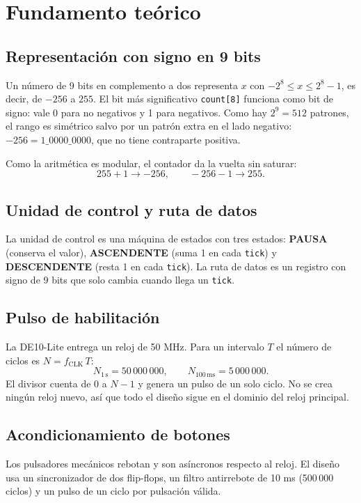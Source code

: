 \documentclass[11pt,a4paper]{article}
\begin{document}
\section{Fundamento te\'orico}
\subsection{Representaci\'on con signo en 9 bits}
Un n\'umero de 9 bits en complemento a dos representa $x$ con $-2^{8}\le x\le 2^{8}-1$, es decir, de $-256$ a $255$. El bit m\'as significativo \texttt{count[8]} funciona como bit de signo: vale 0 para no negativos y 1 para negativos. Como hay $2^9=512$ patrones, el rango es sim\'etrico salvo por un patr\'on extra en el lado negativo: $-256 = 1\_0000\_0000$, que no tiene contraparte positiva.

Como la aritm\'etica es modular, el contador da la vuelta sin saturar:
\[
255 + 1 \longrightarrow -256, \qquad -256 - 1 \longrightarrow 255.
\]

\subsection{Unidad de control y ruta de datos}
La unidad de control es una m\'aquina de estados con tres estados: \textbf{PAUSA} (conserva el valor), \textbf{ASCENDENTE} (suma 1 en cada \texttt{tick}) y \textbf{DESCENDENTE} (resta 1 en cada \texttt{tick}). La ruta de datos es un registro con signo de 9 bits que solo cambia cuando llega un \texttt{tick}.

\subsection{Pulso de habilitaci\'on}
La DE10-Lite entrega un reloj de 50 MHz. Para un intervalo $T$ el n\'umero de ciclos es $N=f_{\text{CLK}}\,T$:
\[
N_{1\,\text{s}} = 50\,000\,000, \qquad N_{100\,\text{ms}} = 5\,000\,000.
\]
El divisor cuenta de $0$ a $N-1$ y genera un pulso de un solo ciclo. No se crea ning\'un reloj nuevo, as\'i que todo el dise\~no sigue en el dominio del reloj principal.

\subsection{Acondicionamiento de botones}
Los pulsadores mec\'anicos rebotan y son as\'incronos respecto al reloj. El dise\~no usa un sincronizador de dos flip-flops, un filtro antirrebote de 10 ms (500\,000 ciclos) y un pulso de un ciclo por pulsaci\'on v\'alida.
\end{document}
